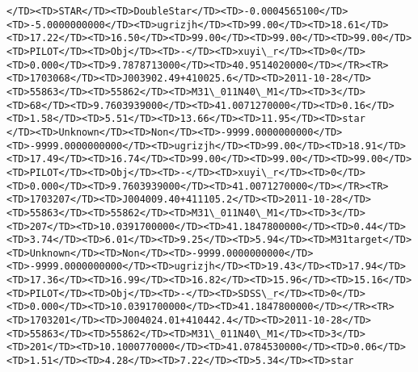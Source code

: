 \documentclass[11pt]{article}
\begin{document}
\begin{Verbatim}[commandchars=\\\{\}]
</TD><TD>STAR</TD><TD>DoubleStar</TD><TD>-0.0004565100</TD><TD>-5.0000000000</TD><TD>ugrizjh</TD><TD>99.00</TD><TD>18.61</TD><TD>17.22</TD><TD>16.50</TD><TD>99.00</TD><TD>99.00</TD><TD>99.00</TD><TD>PILOT</TD><TD>Obj</TD><TD>-</TD><TD>xuyi\_r</TD><TD>0</TD><TD>0.000</TD><TD>9.7878713000</TD><TD>40.9514020000</TD></TR><TR><TD>1703068</TD><TD>J003902.49+410025.6</TD><TD>2011-10-28</TD><TD>55863</TD><TD>55862</TD><TD>M31\_011N40\_M1</TD><TD>3</TD><TD>68</TD><TD>9.7603939000</TD><TD>41.0071270000</TD><TD>0.16</TD><TD>1.58</TD><TD>5.51</TD><TD>13.66</TD><TD>11.95</TD><TD>star     </TD><TD>Unknown</TD><TD>Non</TD><TD>-9999.0000000000</TD><TD>-9999.0000000000</TD><TD>ugrizjh</TD><TD>99.00</TD><TD>18.91</TD><TD>17.49</TD><TD>16.74</TD><TD>99.00</TD><TD>99.00</TD><TD>99.00</TD><TD>PILOT</TD><TD>Obj</TD><TD>-</TD><TD>xuyi\_r</TD><TD>0</TD><TD>0.000</TD><TD>9.7603939000</TD><TD>41.0071270000</TD></TR><TR><TD>1703207</TD><TD>J004009.40+411105.2</TD><TD>2011-10-28</TD><TD>55863</TD><TD>55862</TD><TD>M31\_011N40\_M1</TD><TD>3</TD><TD>207</TD><TD>10.0391700000</TD><TD>41.1847800000</TD><TD>0.44</TD><TD>3.74</TD><TD>6.01</TD><TD>9.25</TD><TD>5.94</TD><TD>M31target</TD><TD>Unknown</TD><TD>Non</TD><TD>-9999.0000000000</TD><TD>-9999.0000000000</TD><TD>ugrizjh</TD><TD>19.43</TD><TD>17.94</TD><TD>17.36</TD><TD>16.99</TD><TD>16.82</TD><TD>15.96</TD><TD>15.16</TD><TD>PILOT</TD><TD>Obj</TD><TD>-</TD><TD>SDSS\_r</TD><TD>0</TD><TD>0.000</TD><TD>10.0391700000</TD><TD>41.1847800000</TD></TR><TR><TD>1703201</TD><TD>J004024.01+410442.4</TD><TD>2011-10-28</TD><TD>55863</TD><TD>55862</TD><TD>M31\_011N40\_M1</TD><TD>3</TD><TD>201</TD><TD>10.1000770000</TD><TD>41.0784530000</TD><TD>0.06</TD><TD>1.51</TD><TD>4.28</TD><TD>7.22</TD><TD>5.34</TD><TD>star     
\end{Verbatim}
\end{document}
